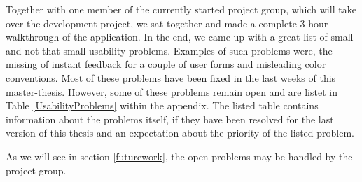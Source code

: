 Together with one member of the currently started project group, which will take over the development project, we sat together and made a complete 3 hour walkthrough of the application. In the end, we came up with a great list of small and not that small usability problems. Examples of such problems were, the missing of instant feedback for a couple of user forms and misleading color conventions. Most of these problems have been fixed in the last weeks of this master-thesis. However, some of these problems remain open and are listet in Table \ref{UsabilityProblems} within the appendix. The listed table contains information about the problems itself, if they have been resolved for the last version of this thesis and an expectation about the priority of the listed problem. 

As we will see in section \ref{futurework}, the open problems may be handled by the project group.

